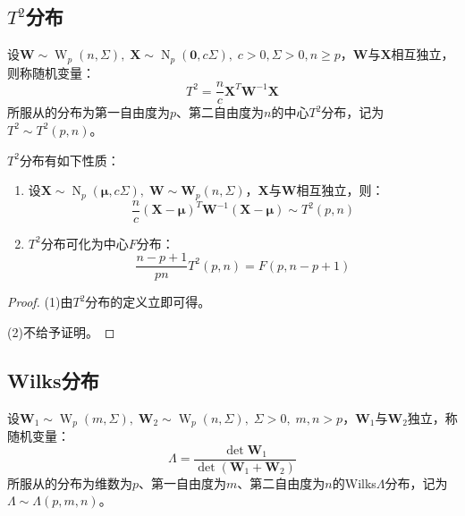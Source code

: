 \subsection{$T^2$分布}
\begin{definition}
	设$\mathbf{W}\sim\operatorname{W}_p(n,\Sigma),\;\mathbf{X}\sim\operatorname{N}_p(\mathbf{0},c\Sigma),\;c>0,\Sigma>0,n\geqslant p$，$\mathbf{W}$与$\mathbf{X}$相互独立，则称随机变量：
	\begin{equation*}
		T^2=\frac{n}{c}\mathbf{X}^T\mathbf{W}^{-1}\mathbf{X}
	\end{equation*}
	所服从的分布为第一自由度为$p$、第二自由度为$n$的中心$T^2$分布，记为$T^2\sim T^2(p,n)$。
\end{definition}
\begin{property}\label{prop:T^2}
	$T^2$分布有如下性质：
	\begin{enumerate}
		\item 设$\mathbf{X}\sim\operatorname{N}_p(\boldsymbol{\mu},c\Sigma),\;\mathbf{W}\sim\mathbf{W}_p(n,\Sigma)$，$\mathbf{X}$与$\mathbf{W}$相互独立，则：
		\begin{equation*}
			\frac{n}{c}(\mathbf{X}-\boldsymbol{\mu})^T\mathbf{W}^{-1}(\mathbf{X}-\boldsymbol{\mu})\sim T^2(p,n)
		\end{equation*}
		\item $T^2$分布可化为中心$F$分布：
		\begin{equation*}
			\frac{n-p+1}{pn}T^2(p,n)=F(p,n-p+1)
		\end{equation*}
	\end{enumerate}
\end{property}
\begin{proof}
	(1)由$T^2$分布的定义立即可得。\par
	(2)不给予证明。
\end{proof}

\subsection{Wilks分布}
\begin{definition}
	设$\mathbf{W}_1\sim\operatorname{W}_p(m,\Sigma),\;\mathbf{W}_2\sim\operatorname{W}_p(n,\Sigma),\;\Sigma>0,\;m,n>p$，$\mathbf{W}_1$与$\mathbf{W}_2$独立，称随机变量：
	\begin{equation*}
		\varLambda=\frac{\det\mathbf{W}_1}{\det(\mathbf{W}_1+\mathbf{W}_2)}
	\end{equation*}
	所服从的分布为维数为$p$、第一自由度为$m$、第二自由度为$n$的Wilks$\varLambda$分布，记为$\varLambda\sim\varLambda(p,m,n)$。
\end{definition}